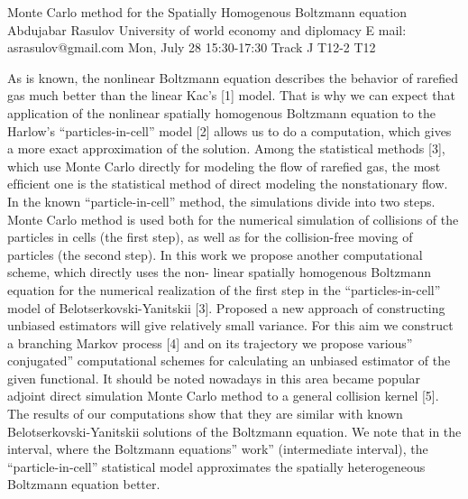 \begin{talk}
  {Monte Carlo method for the Spatially Homogenous Boltzmann equation}%
  {Abdujabar Rasulov}%
  {University of world economy and diplomacy}%
  {E mail: asrasulov@gmail.com}%
  {}%
  {}%
  {Mon, July 28 15:30-17:30 Track J}%
  {T12-2}%
  {T12}%
			
As is known, the nonlinear Boltzmann equation describes the behavior of rareﬁed gas much better than the linear Kac’s [1] model. That is why we can expect that application of the nonlinear spatially homogenous Boltzmann equation to the Harlow’s “particles-in-cell” model [2] allows us to do a computation, which gives a more exact approximation of the solution. 
Among the statistical methods [3], which use Monte Carlo directly for modeling the ﬂow of rareﬁed gas, the most efﬁcient one is the statistical method of direct modeling the nonstationary ﬂow. 
In the known “particle-in-cell” method, the simulations divide into two steps. Monte Carlo method is used both for the numerical simulation of collisions of the particles in cells (the ﬁrst step), as well as for the collision-free moving of particles (the second step). 
In this work we propose another computational scheme, which directly uses the non- linear spatially homogenous Boltzmann equation for the numerical realization of the ﬁrst step in the “particles-in-cell” model of Belotserkovski-Yanitskii [3]. Proposed a new approach of constructing unbiased estimators will give relatively small variance.
 For this aim we construct a branching Markov process [4] and on its trajectory we propose various” conjugated” computational schemes for calculating an unbiased estimator of the given functional. It should be noted nowadays in this area became popular adjoint direct simulation Monte Carlo method to a general collision kernel [5].  
The results of our computations show that they are similar with known Belotserkovski-Yanitskii solutions of the Boltzmann equation. We note that in the interval, where the Boltzmann equations” work” (intermediate interval), the “particle-in-cell” statistical model approximates the spatially heterogeneous Boltzmann equation better. 

\medskip


\end{talk}
